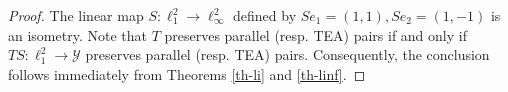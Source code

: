 \documentclass{amsart}
\theoremstyle{definition}
\theoremstyle{remark}
\numberwithin{equation}{section}
\begin{document}
\begin{proof}
The linear map $S:\ell_1^2\to \ell_\infty^2$ defined by 
$Se_1=(1,1), Se_2=(1,-1)$ is an isometry. Note that $T$ preserves parallel (resp. TEA) pairs if and only if $TS:\ell_1^2\to\mathcal{Y}$ preserves  parallel (resp. TEA) pairs. 
Consequently, the conclusion follows immediately from Theorems \ref{th-li} and  \ref{th-linf}. 
\end{proof}
\end{document}
